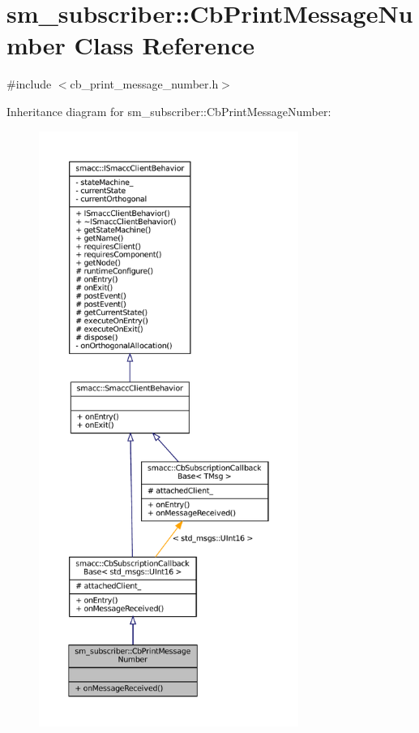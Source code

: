 \hypertarget{classsm__subscriber_1_1CbPrintMessageNumber}{}\section{sm\+\_\+subscriber\+:\+:Cb\+Print\+Message\+Number Class Reference}
\label{classsm__subscriber_1_1CbPrintMessageNumber}


{\ttfamily \#include $<$cb\+\_\+print\+\_\+message\+\_\+number.\+h$>$}



Inheritance diagram for sm\+\_\+subscriber\+:\+:Cb\+Print\+Message\+Number\+:
\nopagebreak
\begin{figure}[H]
\begin{center}
\leavevmode
\includegraphics[height=550pt]{classsm__subscriber_1_1CbPrintMessageNumber__inherit__graph}
\end{center}
\end{figure}



